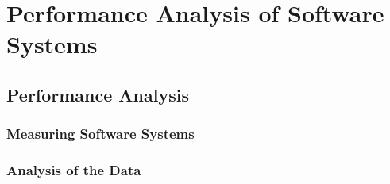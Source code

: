 \chapter{Performance Analysis of Software Systems}
\label{chapter:perfanalysis}
\section{Performance Analysis}


\subsection{Measuring Software Systems}
\label{subsec:measure}


\subsection{Analysis of the Data}

